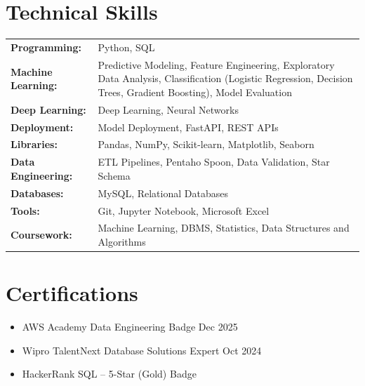 \documentclass[a4paper,10pt]{article}
\begin{document}
\section{Technical Skills}
\begin{tabularx}{\linewidth}{@{}l X@{}}
\textbf{Programming:} & Python, SQL \\
\textbf{Machine Learning:} & Predictive Modeling, Feature Engineering, Exploratory Data Analysis, Classification (Logistic Regression, Decision Trees, Gradient Boosting), Model Evaluation \\
\textbf{Deep Learning:} & Deep Learning, Neural Networks \\
\textbf{Deployment:} & Model Deployment, FastAPI, REST APIs \\
\textbf{Libraries:} & Pandas, NumPy, Scikit-learn, Matplotlib, Seaborn \\
\textbf{Data Engineering:} & ETL Pipelines, Pentaho Spoon, Data Validation, Star Schema \\
\textbf{Databases:} & MySQL, Relational Databases \\
\textbf{Tools:} & Git, Jupyter Notebook, Microsoft Excel \\
\textbf{Coursework:} & Machine Learning, DBMS, Statistics, Data Structures and Algorithms \\
\end{tabularx}

\section{Certifications}
\begin{itemize}[leftmargin=1em, itemsep=1pt, label=--, nosep]
    \item AWS Academy Data Engineering Badge \hfill Dec 2025
    \item Wipro TalentNext Database Solutions Expert \hfill Oct 2024
    \item HackerRank SQL -- 5-Star (Gold) Badge
\end{itemize}
\end{document}
